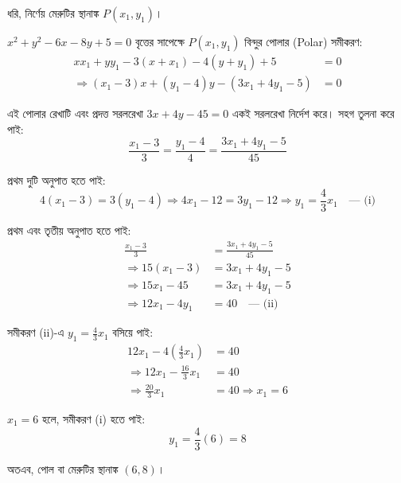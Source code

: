 \documentclass[12pt, a4paper]{article}
\begin{document}
\begin{tcolorbox}[solutionbox={সমাধান (Solution)}]
    \noindent
    ধরি, নির্ণেয় মেরুটির স্থানাঙ্ক $P(x_1, y_1)$।
    
    \vspace{0.5em}
    $x^2 + y^2 - 6x - 8y + 5 = 0$ বৃত্তের সাপেক্ষে $P(x_1, y_1)$ বিন্দুর পোলার (Polar) সমীকরণ:
    \begin{align*}
        xx_1 + yy_1 - 3(x + x_1) - 4(y + y_1) + 5 &= 0 \\
        \Rightarrow (x_1 - 3)x + (y_1 - 4)y - (3x_1 + 4y_1 - 5) &= 0
    \end{align*}
    
    \vspace{0.5em}
    এই পোলার রেখাটি এবং প্রদত্ত সরলরেখা $3x + 4y - 45 = 0$ একই সরলরেখা নির্দেশ করে। সহগ তুলনা করে পাই:
    \[ \frac{x_1 - 3}{3} = \frac{y_1 - 4}{4} = \frac{3x_1 + 4y_1 - 5}{45} \]
    
    \vspace{0.5em}
    প্রথম দুটি অনুপাত হতে পাই:
    \[ 4(x_1 - 3) = 3(y_1 - 4) \Rightarrow 4x_1 - 12 = 3y_1 - 12 \Rightarrow y_1 = \frac{4}{3}x_1 \quad \text{--- (i)} \]
    
    \vspace{0.5em}
    প্রথম এবং তৃতীয় অনুপাত হতে পাই:
    \begin{align*}
        \frac{x_1 - 3}{3} &= \frac{3x_1 + 4y_1 - 5}{45} \\
        \Rightarrow 15(x_1 - 3) &= 3x_1 + 4y_1 - 5 \\
        \Rightarrow 15x_1 - 45 &= 3x_1 + 4y_1 - 5 \\
        \Rightarrow 12x_1 - 4y_1 &= 40 \quad \text{--- (ii)}
    \end{align*}
    
    \vspace{0.5em}
    সমীকরণ (ii)-এ $y_1 = \frac{4}{3}x_1$ বসিয়ে পাই:
    \begin{align*}
        12x_1 - 4\left(\frac{4}{3}x_1\right) &= 40 \\
        \Rightarrow 12x_1 - \frac{16}{3}x_1 &= 40 \\
        \Rightarrow \frac{20}{3}x_1 &= 40 \Rightarrow x_1 = 6
    \end{align*}
    
    \vspace{0.5em}
    $x_1 = 6$ হলে, সমীকরণ (i) হতে পাই:
    \[ y_1 = \frac{4}{3}(6) = 8 \]
    
    \vspace{0.5em}
    অতএব, পোল বা মেরুটির স্থানাঙ্ক $(6, 8)$।
\end{tcolorbox}
\end{document}
